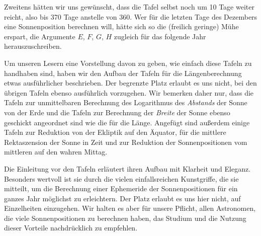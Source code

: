 Zweitens hätten wir uns gewünscht, dass die Tafel selbst noch um 10 Tage weiter reicht, also bis 370 Tage anstelle von 360. Wer für die letzten Tage des Dezembers eine Sonnenposition berechnen will, hätte sich so die (freilich geringe) Mühe erspart, die Argumente $E$, $F$, $G$, $H$ zugleich für das folgende Jahr herauszuschreiben.

Um unseren Lesern eine Vorstellung davon zu geben, wie einfach diese Tafeln zu handhaben sind, haben wir den Aufbau der Tafeln für die Längenberechnung etwas ausführlicher beschrieben. Der begrenzte Platz erlaubt es uns nicht, bei den übrigen Tafeln ebenso ausführlich vorzugehen. Wir bemerken daher nur, dass die Tafeln zur unmittelbaren Berechnung des Logarithmus des \emph{Abstands} der Sonne von der Erde und die Tafeln zur Berechnung der \emph{Breite} der Sonne ebenso geschickt angeordnet sind wie die für die Länge. Angefügt sind außerdem einige Tafeln zur Reduktion von der Ekliptik auf den Äquator, für die mittlere Rektaszension der Sonne in Zeit und zur Reduktion der Sonnenpositionen vom mittleren auf den wahren Mittag.

Die Einleitung vor den Tafeln erläutert ihren Aufbau mit Klarheit und Eleganz. Besonders wertvoll ist sie durch die vielen einfallsreichen Kunstgriffe, die sie mitteilt, um die Berechnung einer Ephemeride der Sonnenpositionen für ein ganzes Jahr möglichst zu erleichtern. Der Platz erlaubt es uns hier nicht, auf Einzelheiten einzugehen. Wir halten es aber für unsere Pflicht, allen Astronomen, die viele Sonnenpositionen zu berechnen haben, das Studium und die Nutzung dieser Vorteile nachdrücklich zu empfehlen.
